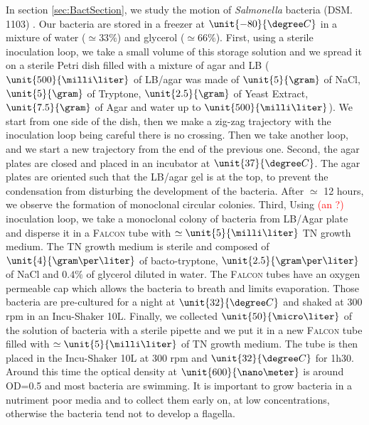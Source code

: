 \documentclass[%
 aip,
 jmp,%
 amsmath,amssymb,
reprint,%
]{revtex4-1}
\begin{document}
In section \ref{sec:BactSection}, we study the motion of \textit{Salmonella} bacteria (DSM. 1103) \citep{21_fabrega2013salmonella}. Our bacteria are stored in a freezer at $\unit{-80}{\degree C}$ in a mixture of water ($\simeq \unit{33}{\%}$) and glycerol ($\simeq \unit{66}{\%}$). First, using a sterile inoculation loop, we take a small volume of this storage solution  and we spread it on a sterile Petri dish filled with a mixture of agar and LB ($\unit{500}{\milli\liter}$ of LB/agar was made of $\unit{5}{\gram}$ of NaCl, $\unit{5}{\gram}$ of Tryptone, $\unit{2.5}{\gram}$ of Yeast Extract, $\unit{7.5}{\gram}$ of Agar and water up to $\unit{500}{\milli\liter}$). We start from one side of the dish, then we make a zig-zag trajectory with the inoculation loop being careful there is no crossing. Then we take another loop, and we start a new trajectory from the end of the previous one. Second, the agar plates are closed and placed in an incubator at $\unit{37}{\degree C}$. The agar plates are oriented such that the LB/agar gel is at the top, to prevent the condensation from disturbing the development of the bacteria. After $\simeq$ 12 hours, we observe the formation of monoclonal circular colonies. Third, Using \textcolor{red}{(an ?)} inoculation loop, we take a monoclonal colony of bacteria from LB/Agar plate and disperse it in a \textsc{Falcon} tube with $\simeq \unit{5}{\milli\liter}$ TN growth medium. The TN growth medium is sterile and composed of $\unit{4}{\gram\per\liter}$ of bacto-tryptone, $\unit{2.5}{\gram\per\liter}$ of NaCl and $0.4\%$ of glycerol diluted in water. The \textsc{Falcon} tubes have an oxygen permeable cap which allows the bacteria to breath and limits evaporation. Those bacteria are pre-cultured for a night at $\unit{32}{\degree C}$ and shaked at 300 rpm in an Incu-Shaker 10L. Finally, we collected $\unit{50}{\micro\liter}$ of the solution of bacteria with a sterile pipette and we put it in a new \textsc{Falcon} tube filled with $\simeq \unit{5}{\milli\liter}$ of TN growth medium. The tube is then placed in the Incu-Shaker 10L at 300 rpm and $\unit{32}{\degree C}$ for 1h30. Around this time the optical density at $\unit{600}{\nano\meter}$ is around OD=0.5 and most bacteria are swimming. It is important to grow bacteria in a nutriment poor media and to collect them early on, at low concentrations, otherwise the bacteria tend not to develop a flagella.
\end{document}
